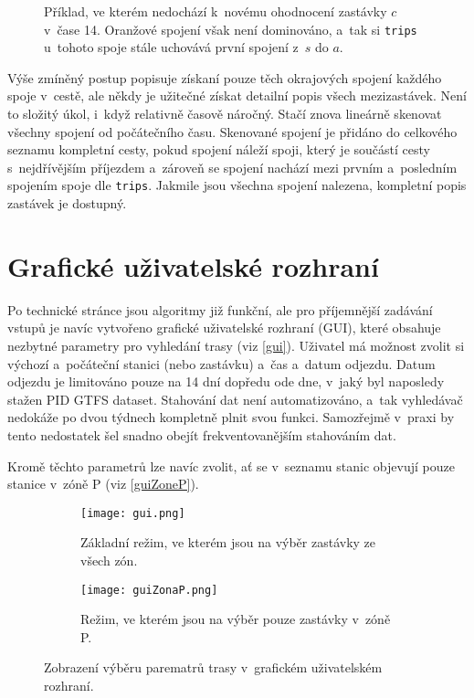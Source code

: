 \begin{figure}[htbp]
	\centering
	\scalebox{0.8}\csaKeepLabel
	\caption[Příklad CSA, ve kterém nedochází k~ohodnocení zastávky, ale informace o~prvním spojení je uchována.]{Příklad, ve kterém nedochází k~novému ohodnocení zastávky \(c\) v~čase 14. \textcolor{RedOrange}{Oranžové} spojení však není dominováno, a~tak si \texttt{trips} u~tohoto spoje stále uchovává první spojení z~\(s\) do \(a\).}
	\label{csaKeep}
\end{figure}

Výše zmíněný postup popisuje získaní pouze těch okrajových spojení každého spoje v~cestě, ale někdy je užitečné získat detailní popis všech mezizastávek. Není to složitý úkol, i~když relativně časově náročný. Stačí znova lineárně skenovat všechny spojení od počátečního času. Skenované spojení je přidáno do celkového seznamu kompletní cesty, pokud spojení náleží spoji, který je součástí cesty s~nejdřívějším příjezdem a~zároveň se spojení nachází mezi prvním a~posledním spojením spoje dle \texttt{trips}. Jakmile jsou všechna spojení nalezena, kompletní popis zastávek je dostupný. 

\section{Grafické uživatelské rozhraní}
Po technické stránce jsou algoritmy již funkční, ale pro příjemnější zadávání vstupů je navíc vytvořeno grafické uživatelské rozhraní (GUI), které obsahuje nezbytné parametry pro vyhledání trasy (viz \autoref{gui}). Uživatel má možnost zvolit si výchozí a~počáteční stanici (nebo zastávku) a~čas a~datum odjezdu. Datum odjezdu je limitováno pouze na 14 dní dopředu ode dne, v~jaký byl naposledy stažen PID GTFS dataset. Stahování dat není automatizováno, a~tak vyhledávač nedokáže po dvou týdnech kompletně plnit svou funkci. Samozřejmě v~praxi by tento nedostatek šel snadno obejít frekventovanějším stahováním dat.

Kromě těchto parametrů lze navíc zvolit, ať se v~seznamu stanic objevují pouze stanice v~zóně P (viz \autoref{guiZoneP}).

\begin{figure}[htbp]
	\centering
	\begin{subfigure}[b]{1\textwidth}
		\centering
		\texttt{[image: gui.png]}
		\caption{Základní režim, ve kterém jsou na výběr zastávky ze všech zón.}
        \label{guiAll}
	\end{subfigure}

	\vspace{1em}
	
	\begin{subfigure}[b]{1\textwidth}
		\centering
		\texttt{[image: guiZonaP.png]}
		\caption{Režim, ve kterém jsou na výběr pouze zastávky v~zóně P.}
        \label{guiZoneP}
	\end{subfigure}

	\caption{Zobrazení výběru parematrů trasy v~grafickém uživatelském rozhraní.}
	\label{gui}
\end{figure}

